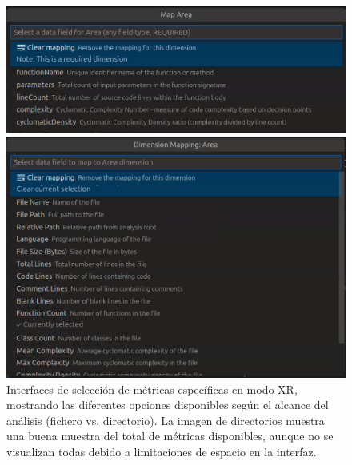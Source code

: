 \documentclass[a4paper, 12pt]{book}
\begin{document}
\begin{figure}[H]
\centering
\begin{minipage}[b]{0.48\textwidth}
\centering
\includegraphics[width=\textwidth]{img/metricas-xr-ficheros.png}
\end{minipage}
\hfill
\begin{minipage}[b]{0.48\textwidth}
\centering
\includegraphics[width=\textwidth]{img/metricas-xr-directorios.png}
\end{minipage}
\caption{Interfaces de selección de métricas específicas en modo XR, mostrando las diferentes opciones disponibles según el alcance del análisis (fichero vs. directorio). La imagen de directorios muestra una buena muestra del total de métricas disponibles, aunque no se visualizan todas debido a limitaciones de espacio en la interfaz.}
\label{fig:metricas-xr-disponibles}
\end{figure}
\end{document}
